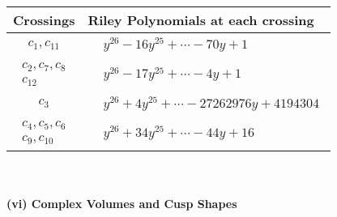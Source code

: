 \documentclass[1p]{elsarticle_modified}
\theoremstyle{definition}
\begin{document}
\begin{tabular}{m{50pt}|m{274pt}}
Crossings & \hspace{64pt}Riley Polynomials at each crossing \\
\hline $$\begin{aligned}c_{1},c_{11}\end{aligned}$$&$\begin{aligned}
&y^{26}-16 y^{25}+\cdots-70 y+1
\end{aligned}$\\
\hline $$\begin{aligned}c_{2},c_{7},c_{8}\\c_{12}\end{aligned}$$&$\begin{aligned}
&y^{26}-17 y^{25}+\cdots-4 y+1
\end{aligned}$\\
\hline $$\begin{aligned}c_{3}\end{aligned}$$&$\begin{aligned}
&y^{26}+4 y^{25}+\cdots-27262976 y+4194304
\end{aligned}$\\
\hline $$\begin{aligned}c_{4},c_{5},c_{6}\\c_{9},c_{10}\end{aligned}$$&$\begin{aligned}
&y^{26}+34 y^{25}+\cdots-44 y+16
\end{aligned}$\\
\hline
\end{tabular}\\~\\
\newpage\flushleft \textbf{(vi) Complex Volumes and Cusp Shapes}
\end{document}
